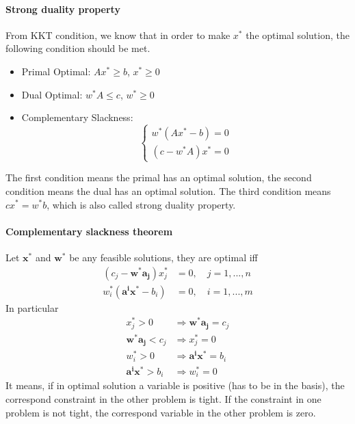             \paragraph{Strong duality property}
                From KKT condition, we know that in order to make $x^*$ the optimal solution, the following condition should be met.
                \begin{itemize}
                    \item Primal Optimal: $Ax^* \ge b$, $x^*\ge 0$
                    \item Dual Optimal: $w^*A \le c$, $w^*\ge 0$
                    \item Complementary Slackness:
                \begin{equation}
                    \begin{cases}
                        w^*(Ax^*-b) = 0\\
                        (c-w^*A)x^* = 0
                    \end{cases} \nonumber
                \end{equation}
                \end{itemize}
                The first condition means the primal has an optimal solution, the second condition means the dual has an optimal solution. The third condition means $cx^*=w^*b$, which is also called strong duality property.

            \paragraph{Complementary slackness theorem}
                Let $\bm{x^*}$ and $\bm{w^*}$ be any feasible solutions, they are optimal iff
                \begin{align}
                    (c_j - \bm{w^*}\bm{a_j})x_j^* &= 0, \quad j = 1,...,n\nonumber \\
                    w_i^*(\bm{a^i}\bm{x^*} - b_i) &= 0, \quad i = 1,...,m\nonumber
                \end{align}
                In particular
                \begin{align}
                    x_j^*>0 &\Rightarrow \bm{w^*}\bm{a_j} = c_j \nonumber \\
                    \bm{w^*}\bm{a_j} < c_j &\Rightarrow x_j^* = 0 \nonumber \\
                    w_i^* >0 &\Rightarrow \bm{a^i}\bm{x^*} = b_i \nonumber \\
                    \bm{a^i}\bm{x^*} > b_i &\Rightarrow w_i^*=0\nonumber
                \end{align}
                It means, if in optimal solution a variable is positive (has to be in the basis), the correspond constraint in the other problem is tight. If the constraint in one problem is not tight, the correspond variable in the other problem is zero.

